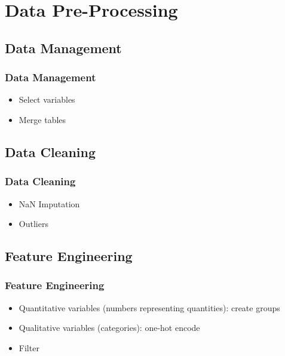 \section{Data Pre-Processing}


\subsection{Data Management}

\begin{frame}\frametitle{Data Management}
   \begin{itemize}
      \item Select variables
      \item Merge tables
   \end{itemize}
\end{frame}


\subsection{Data Cleaning}

\begin{frame}\frametitle{Data Cleaning}
   \begin{itemize}
      \item NaN Imputation
      \item Outliers
   \end{itemize}
\end{frame}


\subsection{Feature Engineering}

\begin{frame}\frametitle{Feature Engineering}
   \begin{itemize}
      \item Quantitative variables (numbers representing quantities): create groups
      \item Qualitative variables (categories): one-hot encode
      \item Filter
   \end{itemize}
\end{frame}


